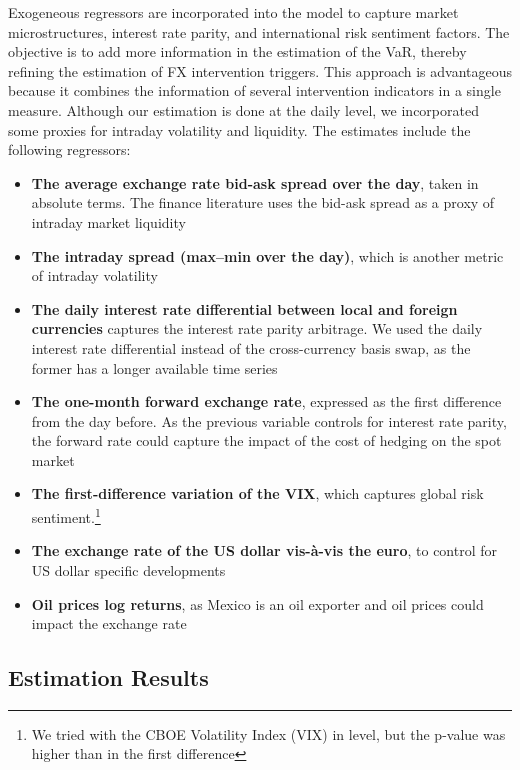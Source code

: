 \documentclass[11pt]{article}
\begin{document}
Exogeneous  regressors  are incorporated  into  the  model to  capture  market
microstructures,  interest  rate  parity,  and  international  risk  sentiment
factors. The  objective is to  add more information  in the estimation  of the
VaR,  thereby  refining  the  estimation of  FX  intervention  triggers.  This
approach  is  advantageous because  it  combines  the information  of  several
intervention indicators in  a single measure. Although our  estimation is done
at the daily  level, we incorporated some proxies for  intraday volatility and
liquidity. The estimates include the following regressors:

\begin{itemize}
\item \textbf{The average exchange rate bid-ask spread over the day}, taken in
  absolute terms. The finance literature uses the bid-ask spread as a proxy of
  intraday market liquidity
\item \textbf{The intraday spread (max–min over the day)}, which is another
  metric of intraday volatility
\item \textbf{The daily  interest rate differential between  local and foreign
currencies} captures  the interest  rate parity arbitrage.  We used  the daily
interest rate  differential instead of  the cross-currency basis swap,  as the
former has a longer available time series
\item \textbf{The  one-month forward  exchange rate},  expressed as  the first
difference from the day before. As the previous variable controls for interest
rate parity, the forward rate could capture  the impact of the cost of hedging
on the spot market
\item \textbf{The first-difference variation of the VIX}, which captures
  global risk sentiment.\footnote{We tried with the CBOE Volatility Index
    (VIX) in level, but the p-value was higher than in the first difference}
\item \textbf{The exchange rate of the US dollar vis-à-vis the euro}, to
  control for US dollar specific developments
\item \textbf{Oil prices log returns}, as Mexico is an oil exporter and oil
  prices could impact the exchange rate
\end{itemize}


\subsection{Estimation Results}
\label{sec:estimation-results}
\end{document}
